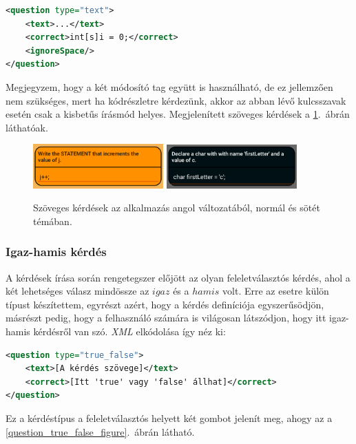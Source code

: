 \documentclass[12pt,a4paper]{article}
\newcommand{\xml}{\textit{XML}\xspace}
\begin{document}
	\begin{lstlisting}[language=XML]	
<question type="text">
	<text>...</text>
	<correct>int[s]i = 0;</correct>
	<ignoreSpace/>
</question>
	\end{lstlisting}
	
	\noindent
	Megjegyzem, hogy a két módosító tag együtt is használható, de ez jellemzően nem szükséges, mert ha kódrészletre kérdezünk, akkor az abban lévő kulcsszavak esetén csak a kisbetűs írásmód helyes. Megjelenített szöveges kérdések a \ref{question_text_figure}.\ ábrán láthatóak.
	
	\begin{figure}[h!]
		\centering
		\includegraphics[width=5cm]{question_text}
		\includegraphics[width=5cm]{question_text_dark}
		\caption{Szöveges kérdések az alkalmazás angol változatából, normál és sötét témában.}
		\label{question_text_figure}
	\end{figure}
	
	\subsubsection{Igaz-hamis kérdés}
	
	A kérdések írása során rengetegszer előjött az olyan feleletválasztós kérdés, ahol a két lehetséges válasz mindössze az $igaz$ és a $hamis$ volt. Erre az esetre külön típust készítettem, egyrészt azért, hogy a kérdés definíciója egyszerűsödjön, másrészt pedig, hogy a felhasználó számára is világosan látszódjon, hogy itt igaz-hamis kérdésről van szó. \xml elkódolása így néz ki:
	
	\begin{lstlisting}[language=XML]	
<question type="true_false">
	<text>[A kérdés szövege]</text>
	<correct>[Itt 'true' vagy 'false' állhat]</correct>
</question>
	\end{lstlisting}
	
	Ez a kérdéstípus a feleletválasztós helyett két gombot jelenít meg, ahogy az a \ref{question_true_false_figure}.\ ábrán látható.
	
\end{document}

